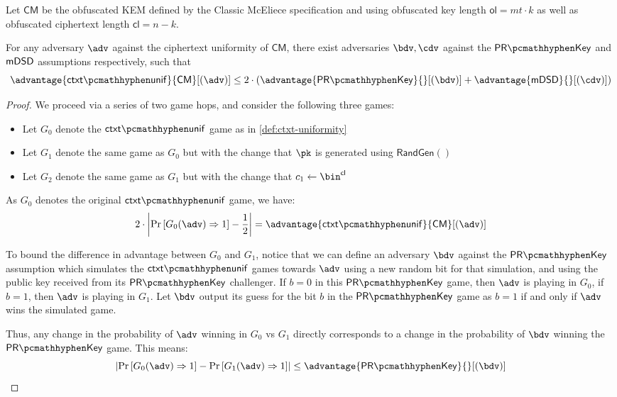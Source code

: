 \begin{lemma} \label{lem:classic-mceliece-ctxt-unif}
    Let $\textsf{CM}$ be the obfuscated KEM defined by the Classic McEliece specification \cite{NISTPQC-R4:ClassicMcEliece22} and using obfuscated key length $\textsf{ol} = mt \cdot k$ as well as obfuscated ciphertext length $\textsf{cl} = n-k$.
    
    For any adversary $\adv$ against the ciphertext uniformity of $\textsf{CM}$, there exist adversaries $\bdv, \cdv$ against the $\prkey$ and $\mathsf{mDSD}$ assumptions respectively, such that
    \[ \advantage{\ctxtunif}{\textsf{CM}}[(\adv)] \leq 2 \cdot \left( \advantage{\prkey}{}[(\bdv)] + \advantage{\mdsd}{}[(\cdv)] \right) \]
\end{lemma}
\begin{proof}
    We proceed via a series of two game hops, and consider the following three games:
    \begin{itemize}
        \item Let $G_0$ denote the $\ctxtunif$ game as in \cref{def:ctxt-uniformity}
        \item Let $G_1$ denote the same game as $G_0$ but with the change that $\pk$ is generated using $\textsf{RandGen}()$
        \item Let $G_2$ denote the same game as $G_1$ but with the change that $c_1 \gets \bin^\textsf{cl}$
    \end{itemize}

    As $G_0$ denotes the original $\ctxtunif$ game, we have:
    \[ 2 \cdot \left| \Pr\left[G_0(\adv) \Rightarrow 1\right] - \frac{1}{2} \right| = \advantage{\ctxtunif}{\textsf{CM}}[(\adv)] \]

    To bound the difference in advantage between $G_0$ and $G_1$, notice that we can define an adversary $\bdv$ against the $\prkey$ assumption which simulates the $\ctxtunif$ games towards $\adv$ using a new random bit for that simulation, and using the public key received from its $\prkey$ challenger. If $b=0$ in this $\prkey$ game, then $\adv$ is playing in $G_0$, if $b=1$, then $\adv$ is playing in $G_1$. Let $\bdv$ output its guess for the bit $b$ in the $\prkey$ game as $b=1$ if and only if $\adv$ wins the simulated game.

    Thus, any change in the probability of $\adv$ winning in $G_0$ vs $G_1$ directly corresponds to a change in the probability of $\bdv$ winning the $\prkey$ game. This means:
    \[ \left| \Pr\left[G_0(\adv) \Rightarrow 1\right] - \Pr\left[G_1(\adv) \Rightarrow 1\right] \right| \leq \advantage{\prkey}{}[(\bdv)] \]


\end{proof}
